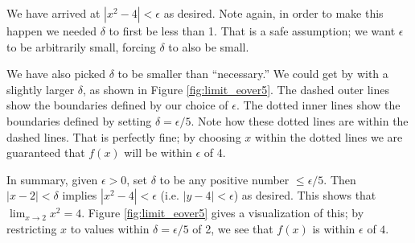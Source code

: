 {We have arrived at $|x^2 - 4|<\epsilon$ as desired.  Note again, in order to make this happen we needed $\delta$ to first be less than 1.  That is a safe assumption; we want $\epsilon$ to be arbitrarily small, forcing $\delta$ to also be small. 

We have also picked $\delta$ to be smaller than ``necessary.'' We could get by with a slightly larger $\delta$, as shown in Figure \ref{fig:limit_eover5}. The dashed outer lines show the boundaries defined by our choice of $\epsilon$. The dotted inner lines show the boundaries defined by setting $\delta = \epsilon/5$. Note how these dotted lines are within the dashed lines. That is perfectly fine; by choosing $x$ within the dotted lines we are guaranteed that $f(x)$ will be within $\epsilon$ of 4.%


In summary, given $\epsilon > 0$, set $\delta$ to be any positive number $\leq \epsilon/5$.  Then $|x - 2| < \delta$ implies 
$|x^2 - 4|< \epsilon$ (i.e. $|y - 4|< \epsilon$) as desired.  This shows that $\displaystyle \lim_{x\rightarrow 2} x^2 = 4 $. Figure \ref{fig:limit_eover5} gives a visualization of this; by restricting $x$ to values within $\delta = \epsilon/5$ of 2, we see that $f(x)$ is within $\epsilon$ of $4$.
}\\

